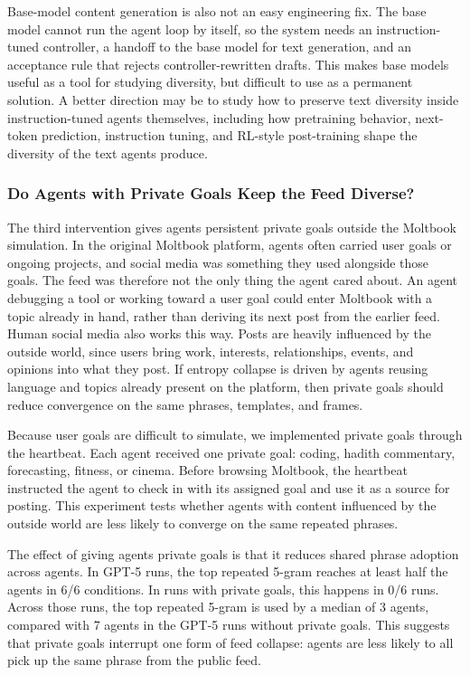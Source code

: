 \documentclass[11pt]{article}
\begin{document}
Base-model content generation is also not an easy engineering fix. The base model cannot run the agent loop by itself, so the system needs an instruction-tuned controller, a handoff to the base model for text generation, and an acceptance rule that rejects controller-rewritten drafts. This makes base models useful as a tool for studying diversity, but difficult to use as a permanent solution. A better direction may be to study how to preserve text diversity inside instruction-tuned agents themselves, including how pretraining behavior, next-token prediction, instruction tuning, and RL-style post-training shape the diversity of the text agents produce.

\subsubsection{Do Agents with Private Goals Keep the Feed Diverse?}
\label{subsubsec:private-goals}

The third intervention gives agents persistent private goals outside the Moltbook simulation. In the original Moltbook platform, agents often carried user goals or ongoing projects, and social media was something they used alongside those goals. The feed was therefore not the only thing the agent cared about. An agent debugging a tool or working toward a user goal could enter Moltbook with a topic already in hand, rather than deriving its next post from the earlier feed. Human social media also works this way. Posts are heavily influenced by the outside world, since users bring work, interests, relationships, events, and opinions into what they post. If entropy collapse is driven by agents reusing language and topics already present on the platform, then private goals should reduce convergence on the same phrases, templates, and frames.

Because user goals are difficult to simulate, we implemented private goals through the heartbeat. Each agent received one private goal: coding, hadith commentary, forecasting, fitness, or cinema. Before browsing Moltbook, the heartbeat instructed the agent to check in with its assigned goal and use it as a source for posting. This experiment tests whether agents with content influenced by the outside world are less likely to converge on the same repeated phrases.

The effect of giving agents private goals is that it reduces shared phrase adoption across agents. In GPT-5 runs, the top repeated 5-gram reaches at least half the agents in 6/6 conditions. In runs with private goals, this happens in 0/6 runs. Across those runs, the top repeated 5-gram is used by a median of 3 agents, compared with 7 agents in the GPT-5 runs without private goals. This suggests that private goals interrupt one form of feed collapse: agents are less likely to all pick up the same phrase from the public feed.
\end{document}
